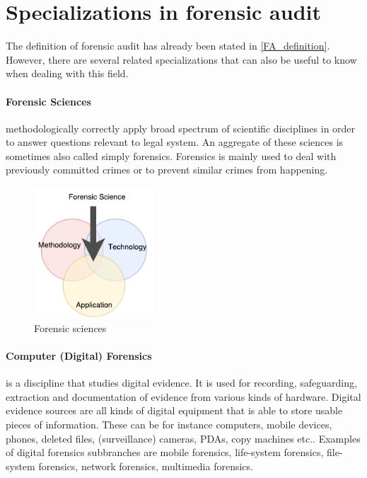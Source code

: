 \section{Specializations in forensic audit}
The definition of forensic audit has already been stated in \ref{FA_definition}. However, there are several related specializations that can also be useful to know when dealing with this field.

\paragraph{Forensic Sciences} methodologically correctly apply broad spectrum of scientific disciplines in order to answer questions relevant to legal system.  An aggregate of these sciences is sometimes also called simply forensics. Forensics is mainly used to deal with previously committed crimes or to prevent similar crimes from happening.


\begin{figure}[h]
	\begin{center} 
	\includegraphics[width=0.4\textwidth]{img/forensic_science.pdf}
	\end{center}
	\caption{Forensic sciences}
\end{figure}


\paragraph{Computer (Digital) Forensics} is a discipline that studies digital evidence. It is used for recording, safeguarding, extraction and documentation of evidence from various kinds of hardware. Digital evidence sources are all kinds of digital equipment that is able to store usable pieces of information. These can be for instance computers, mobile devices, phones, deleted files, (surveillance) cameras, PDAs, copy machines etc..  Examples of digital forensics subbranches are mobile forensics, life-system forensics, file-system forensics, network forensics, multimedia forensics.  

